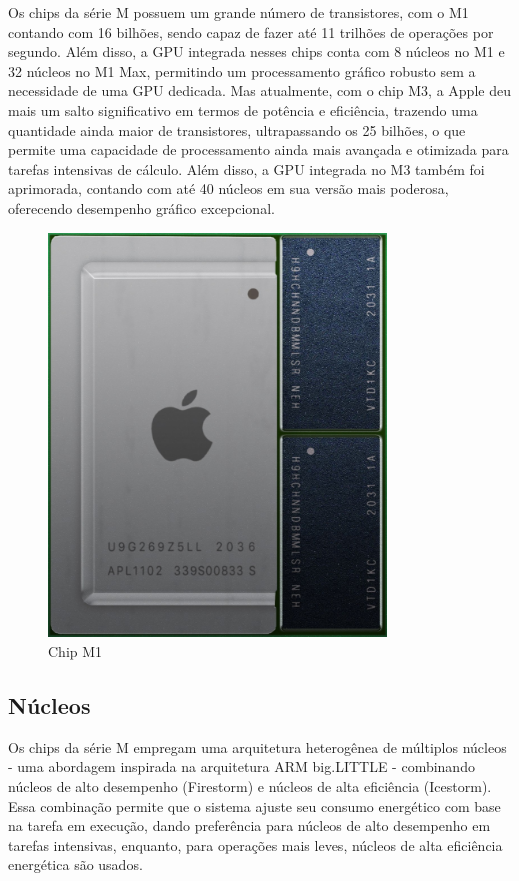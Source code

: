 \documentclass[a4paper,times,12pt]{article}
\begin{document}
Os chips da série M possuem um grande número de transistores, com o M1 contando com 16 bilhões, sendo capaz de fazer até 11 trilhões de operações por segundo. Além disso, a GPU integrada nesses chips conta com 8 núcleos no M1 e 32 núcleos no M1 Max, permitindo um processamento gráfico robusto sem a necessidade de uma GPU dedicada. Mas atualmente, com o chip M3, a Apple deu mais um salto significativo em termos de potência e eficiência, trazendo uma quantidade ainda maior de transistores, ultrapassando os 25 bilhões, o que permite uma capacidade de processamento ainda mais avançada e otimizada para tarefas intensivas de cálculo. Além disso, a GPU integrada no M3 também foi aprimorada, contando com até 40 núcleos em sua versão mais poderosa, oferecendo desempenho gráfico excepcional.

\begin{figure}[h]
    \centering
    \includegraphics[width=0.8\textwidth]{./apple.jpeg}
    \caption{Chip M1}
    \label{fig:apple_m1}
\end{figure}

\subsection{Núcleos}
\hspace{+15pt}
Os chips da série M empregam uma arquitetura heterogênea de múltiplos núcleos - uma abordagem inspirada na arquitetura ARM big.LITTLE - combinando núcleos de alto desempenho (Firestorm) e núcleos de alta eficiência (Icestorm). Essa combinação permite que o sistema ajuste seu consumo energético com base na tarefa em execução, dando preferência para núcleos de alto desempenho em tarefas intensivas, enquanto, para operações mais leves, núcleos de alta eficiência energética são usados.
\end{document}
